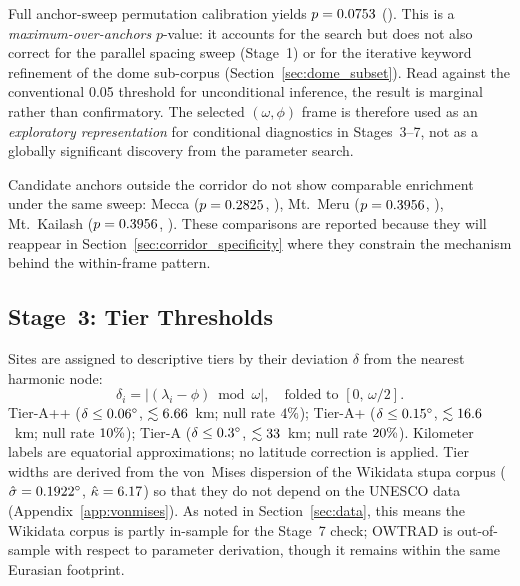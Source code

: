 \documentclass[12pt,a4paper]{article}
\newcommand{\degr}{\ifmmode{^\circ}\else\textdegree{}\fi}
\begin{document}
Full anchor-sweep permutation calibration yields
$p = 0.0753$ (\anchorMaxPermPSig{}). This is a
\emph{maximum-over-anchors} $p$-value: it accounts for the search but
does not also correct for the parallel spacing sweep (Stage~1) or for
the iterative keyword refinement of the dome sub-corpus
(Section~\ref{sec:dome_subset}). Read against the conventional 0.05
threshold for unconditional inference, the result is marginal rather
than confirmatory. The selected $(\omega, \phi)$ frame is therefore
used as an \emph{exploratory representation} for conditional
diagnostics in Stages~3--7, not as a globally significant discovery
from the parameter search.


Candidate anchors outside the corridor do not show comparable
enrichment under the same sweep: Mecca ($p = 0.2825$,
\pMeccaAnchorSig{}), Mt.~Meru ($p = 0.3956$, \pMeruAnchorSig{}),
Mt.~Kailash ($p = 0.3956$, \pKailashAnchorSig{}). These
comparisons are reported because they will reappear in
Section~\ref{sec:corridor_specificity} where they constrain the
mechanism behind the within-frame pattern.

\subsection{Stage~3: Tier Thresholds}

Sites are assigned to descriptive tiers by their deviation $\delta$
from the nearest harmonic node:
\[
  \delta_i = \bigl|(\lambda_i - \phi)\bmod \omega\bigr|,
  \quad \text{folded to } [0,\, \omega/2].
\]
Tier-A++ ($\delta \leq \AppThreshDeg\degr{}$, $\lesssim6.66$~km;
null rate $4\%$); Tier-A+
($\delta \leq \ApThreshDeg\degr{}$, $\lesssim16.6$~km; null rate
$10\%$); Tier-A ($\delta \leq \ATierThreshDeg\degr{}$,
$\lesssim33$~km; null rate $20\%$). Kilometer labels
are equatorial approximations; no latitude correction is applied. Tier
widths are derived from the von~Mises dispersion of the Wikidata stupa
corpus ($\hat{\sigma} = \vmSigmaDegStupa\degr{}$,
$\hat{\kappa} = 6.17$) so that they do not depend on the
UNESCO data (Appendix~\ref{app:vonmises}). As noted in
Section~\ref{sec:data}, this means the Wikidata corpus is partly
in-sample for the Stage~7 check; OWTRAD is out-of-sample with respect
to parameter derivation, though it remains within the same Eurasian
footprint.
\end{document}
